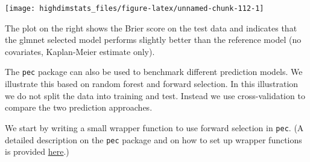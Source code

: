 \documentclass[
]{book}
\begin{document}
\begin{center}\texttt{[image: highdimstats\_files/figure-latex/unnamed-chunk-112-1]} \end{center}

The plot on the right shows the Brier score on the test data and indicates that the glmnet selected model performs slightly better than the reference model (no covariates, Kaplan-Meier estimate only).

The \texttt{pec} package can also be used to benchmark different prediction models. We illustrate this based on random forest and forward selection. In this illustration we do not split the data into training and test. Instead we use cross-validation to compare the two prediction approaches.

We start by writing a small wrapper function to use forward selection in \texttt{pec}. (A detailed description on the \texttt{pec} package and on how to set up wrapper functions is provided \href{https://pubmed.ncbi.nlm.nih.gov/25317082/}{here}.)
\end{document}
